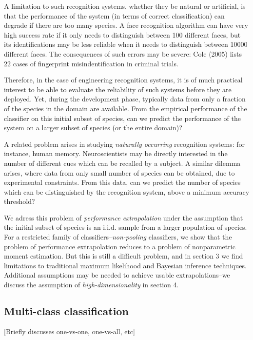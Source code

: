 \documentclass{article}
\begin{document}
A limitation to such recognition systems, whether they be natural or
artificial, is that the performance of the system (in terms of correct
classification) can degrade if there are too many species.  A face
recognition algorithm can have very high success rate if it only needs
to distinguish between 100 different faces, but its identifications
may be less reliable when it needs to distinguish between 10000
different faces.  The consequences of such errors may be severe: Cole
(2005) lists 22 cases of fingerprint misindentification in criminal
trials.

Therefore, in the case of engineering recognition systems, it is of
much practical interest to be able to evaluate the reliability of such
systems before they are deployed.  Yet, during the development phase,
typically data from only a fraction of the species in the domain are
available.  From the empirical performance of the classifier on this
initial subset of species, can we predict the performance of the
system on a larger subset of species (or the entire domain)?

A related problem arises in studying \emph{naturally occurring}
recognition systems: for instance, human memory.  Neuroscientists may
be directly interested in the number of different cues which can be
recalled by a subject.  A similar dilemma arises, where data from only
small number of species can be obtained, due to experimental
constraints.  From this data, can we predict the number of species
which can be distinguished by the recognition system, above a minimum
accuracy threshold?

We adress this problem of \emph{performance extrapolation} under the
assumption that the initial subset of species is an i.i.d. sample from
a larger population of species.  For a restricted family of
classifiers--\emph{non-pooling} classifiers, we show that the problem
of performance extrapolation reduces to a problem of nonparametric
moment estimation.  But this is still a difficult problem, and in
section 3 we find limitations to traditional maximum likelihood and
Bayesian inference techniques.  Additional assumptions may be needed
to achieve usable extrapolations--we discuss the assumption of
\emph{high-dimensionality} in section 4.

\subsection{Multi-class classification}

[Briefly discusses one-vs-one, one-vs-all, etc]
\end{document}
